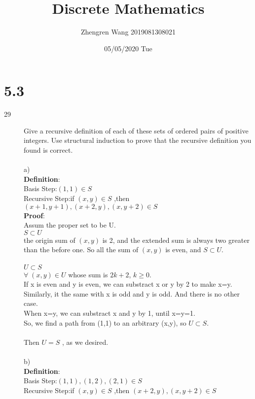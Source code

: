 \documentclass[UTF8]{article}
\title{Discrete Mathematics}
\author{Zhengren Wang 2019081308021}
\date{05/05/2020 Tue }
\begin{document}
\maketitle 

\part{5.3}
\begin{description}
    \item[29]Give a recursive definition of each of these sets of ordered pairs of positive integers. Use structural induction to prove that the recursive definition you found is correct. \\\\
        a)\\
        \textbf{Definition}:\\
        Basis Step:$(1,1) \in S$  \\
        Recursive Step:if $(x,y)\in S$ ,then $(x+1,y+1),(x+2,y),(x,y+2) \in S$  \\


        \textbf{Proof}: \\ 
        Assum the proper set to be U.\\
        $S \subset U$ \\
        the origin sum of $(x,y)$ is 2, and the extended sum is always two greater than the before one. So all the sum of $(x,y)$ is even, and $S \subset U $. \\\\
        $U \subset S$  \\
        $\forall \;(x,y) \in U$ whose sum is $2k+2$, $k \geq 0$. \\
        If x is even and y is even, we can substract x or y by 2 to make x=y. \\
        Similarly, it the same with x is odd and y is odd. And there is no other case. \\
        When x=y, we can substract x and y by 1, until x=y=1. \\
        So, we find a path from (1,1) to an arbitrary (x,y), so $U \subset S$. \\\\
        Then  $U=S$ , as we desired. \\\\

        b)\\
        \textbf{Definition}:\\
        Basis Step:$(1,1),(1,2),(2,1) \in S$  \\
        Recursive Step:if $(x,y)\in S$ ,then $(x+2,y),(x,y+2) \in S$  \\\\


\end{description}
\end{document}

